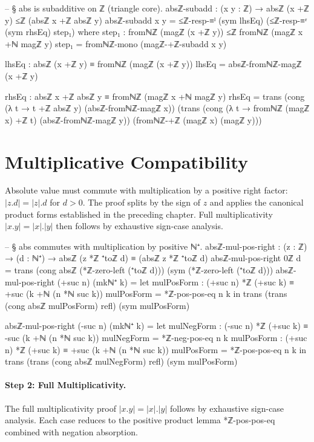 \documentclass[11pt,a4paper]{book}
\def\cdot{.}%
\def\texttt#1{#1}%
\begin{document}
\begin{code}
-- § abs is subadditive on ℤ (triangle core).
absℤ-subadd : (x y : ℤ) → absℤ (x +ℤ y) ≤ℤ (absℤ x +ℤ absℤ y)
absℤ-subadd x y =
  ≤ℤ-resp-≡ˡ (sym lhsEq) (≤ℤ-resp-≡ʳ (sym rhsEq) step₁)
  where
    step₁ : fromℕℤ (magℤ (x +ℤ y)) ≤ℤ fromℕℤ (magℤ x +ℕ magℤ y)
    step₁ = fromℕℤ-mono (magℤ-+ℤ-subadd x y)

    lhsEq : absℤ (x +ℤ y) ≡ fromℕℤ (magℤ (x +ℤ y))
    lhsEq = absℤ-fromℕℤ-magℤ (x +ℤ y)

    rhsEq : absℤ x +ℤ absℤ y ≡ fromℕℤ (magℤ x +ℕ magℤ y)
    rhsEq =
      trans
        (cong (λ t → t +ℤ absℤ y) (absℤ-fromℕℤ-magℤ x))
        (trans
          (cong (λ t → fromℕℤ (magℤ x) +ℤ t) (absℤ-fromℕℤ-magℤ y))
          (fromℕℤ-+ℤ (magℤ x) (magℤ y)))
\end{code}

\section{Multiplicative Compatibility}

Absolute value must commute with multiplication by a positive right factor: $|z \cdot d| = |z| \cdot d$ for $d > 0$.
The proof splits by the sign of $z$ and applies the canonical product forms established in the preceding chapter.
Full multiplicativity $|x \cdot y| = |x| \cdot |y|$ then follows by exhaustive sign-case analysis.

\begin{code}
-- § abs commutes with multiplication by positive ℕ⁺.
absℤ-mul-pos-right : (z : ℤ) → (d : ℕ⁺) → absℤ (z *ℤ ⁺toℤ d) ≡ (absℤ z *ℤ ⁺toℤ d)
absℤ-mul-pos-right 0ℤ d =
  trans
    (cong absℤ (*ℤ-zero-left (⁺toℤ d)))
    (sym (*ℤ-zero-left (⁺toℤ d)))
absℤ-mul-pos-right (+suc n) (mkℕ⁺ k) =
  let mulPosForm : (+suc n) *ℤ (+suc k) ≡ +suc (k +ℕ (n *ℕ suc k))
      mulPosForm = *ℤ-pos-pos-eq n k
  in
  trans
    (trans (cong absℤ mulPosForm) refl)
    (sym mulPosForm)

absℤ-mul-pos-right (-suc n) (mkℕ⁺ k) =
  let mulNegForm : (-suc n) *ℤ (+suc k) ≡ -suc (k +ℕ (n *ℕ suc k))
      mulNegForm = *ℤ-neg-pos-eq n k
      mulPosForm : (+suc n) *ℤ (+suc k) ≡ +suc (k +ℕ (n *ℕ suc k))
      mulPosForm = *ℤ-pos-pos-eq n k
  in
  trans
    (trans (cong absℤ mulNegForm) refl)
    (sym mulPosForm)
\end{code}

\paragraph{Step 2: Full Multiplicativity.}
The full multiplicativity proof $|x \cdot y| = |x| \cdot |y|$ follows by
exhaustive sign-case analysis. Each case reduces to the positive product
lemma \texttt{*ℤ-pos-pos-eq} combined with negation absorption.
\end{document}

